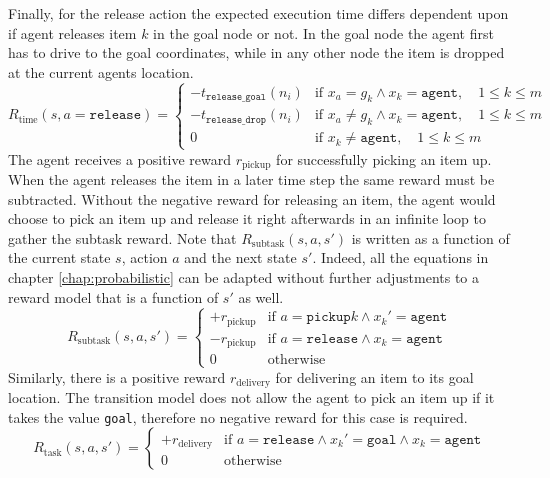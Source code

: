 Finally, for the release action the expected execution time differs dependent upon if agent releases item $k$ in the goal node or not. In the goal node the agent first has to drive to the goal coordinates, while in any other node the item is dropped at the current agents location. 
\begin{equation}
     R_\text{time}(s, a=\texttt{release}) = \begin{cases}
    -t_\texttt{release\_goal}(n_i) & \text{if }x_a=g_k \land x_k=\texttt{agent}, \quad 1 \leq k \leq m \\
    -t_\texttt{release\_drop}(n_i) & \text{if }x_a\neq g_k \land x_k=\texttt{agent}, \quad 1 \leq k \leq m\\
    0 & \text{if }x_k \neq \texttt{agent}, \quad 1 \leq k \leq m
    \end{cases}
\end{equation}
The agent receives a positive reward $r_\text{pickup}$ for successfully picking an item up. When the agent releases the item in a later time step the same reward must be subtracted. Without the negative reward for releasing an item, the agent would choose to pick an item up and release it right afterwards in an infinite loop to gather the subtask reward. Note that $R_\text{subtask}(s,a,s')$ is written as a function of the current state $s$, action $a$ and the next state $s'$. Indeed, all the equations in chapter \ref{chap:probabilistic} can be adapted without further adjustments to a reward model that is a function of $s'$ as well. 
\begin{equation}
    R_\text{subtask}(s,a,s') = \begin{cases}
    +r_\text{pickup} & \text{if }a=\texttt{pickup}k \land x_k'=\texttt{agent}\\
    -r_\text{pickup} & \text{if }a=\texttt{release}\land x_k=\texttt{agent}\\
    0 & \text{otherwise}\end{cases}
\end{equation}
Similarly, there is a positive reward $r_\text{delivery}$ for delivering an item to its goal location. The transition model does not allow the agent to pick an item up if it takes the value \texttt{goal}, therefore no negative reward for this case is required. 
\begin{equation}
    R_\text{task}(s,a,s') = \begin{cases} + r_\text{delivery} & \text{if }a=\texttt{release}\land x_k'=\texttt{goal}\land x_k=\texttt{agent}\\
    0 & \text{otherwise}
    \end{cases}
\end{equation}
